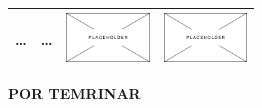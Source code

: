 \begin{landscape}
\begin{longtable}{m{7cm}m{8cm}cc}
 \ldots & 
 \ldots & 
 \includegraphics[width=2.2cm]{imagenes/placeholder.png} & 
 \includegraphics[width=2.2cm]{imagenes/placeholder.png} \\
\hline


\end{longtable}

\textbf{POR TEMRINAR}

\end{landscape}



